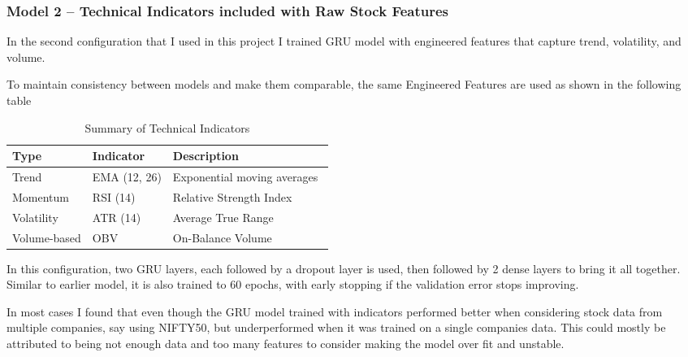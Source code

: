 \subsubsection{Model 2 – Technical Indicators included with Raw Stock Features}

In the second configuration that I used in this project I trained GRU model with engineered features that capture trend, volatility, and volume.

To maintain consistency between models and make them comparable, the same Engineered Features are used as shown in the following table

\begin{table}[h]
    \centering
    \begin{tabular}{|l|l|p{0.5\linewidth}|}
        \hline
        \textbf{Type} & \textbf{Indicator} & \textbf{Description} \\
        \hline
        \hline
        Trend & EMA (12, 26) & Exponential moving averages \\
        \hline
        Momentum & RSI (14) & Relative Strength Index \\
        \hline
        Volatility & ATR (14) & Average True Range \\
        \hline
        Volume-based & OBV & On-Balance Volume \\
        \hline
    \end{tabular}
    \caption{Summary of Technical Indicators}
    \label{tab:tech_indicators}
\end{table}

In this configuration, two GRU layers, each followed by a dropout layer is used, then followed by 2 dense layers to bring it all together. Similar to earlier model, it is also trained to 60 epochs, with early stopping if the validation error stops improving.

In most cases I found that even though the GRU model trained with indicators performed better when considering stock data from multiple companies, say using NIFTY50, but underperformed when it was trained on a single companies data. This could mostly be attributed to being not enough data and too many features to consider making the model over fit and unstable.

